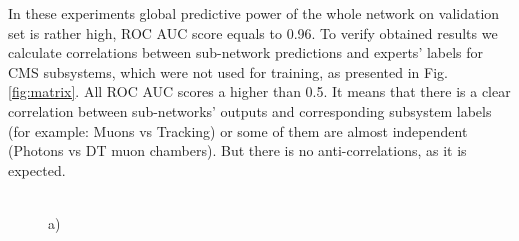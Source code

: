 \documentclass[a4paper]{jpconf}
\begin{document}
In these experiments global predictive power of the whole network on validation set is rather high, ROC AUC score equals to 0.96.
To verify obtained results we calculate correlations between sub-network predictions and experts' labels for CMS subsystems, which were not used for training, as presented in Fig. \ref{fig:matrix}. All ROC AUC scores a higher than 0.5. It means that there is a clear correlation between sub-networks’ outputs and corresponding subsystem labels (for example: Muons vs Tracking) or some of them are almost independent (Photons vs DT muon chambers). But there is no anti-correlations, as it is expected. 

\begin{figure}[H]
\begin{minipage}[h!]{0.47\linewidth}
 \\a) 
\end{minipage}
\hfill
\begin{minipage}[h!]{0.47\linewidth}

\end{minipage}
\end{figure}
\end{document}
